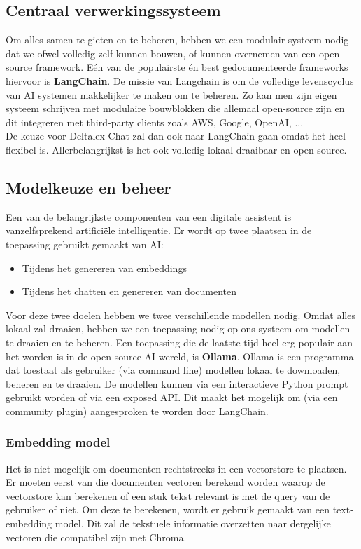\subsection{Centraal verwerkingssysteem}
Om alles samen te gieten en te beheren, hebben we een modulair systeem nodig dat we ofwel volledig zelf kunnen bouwen, of kunnen overnemen van een open-source framework. 
Eén van de populairste én best gedocumenteerde frameworks hiervoor is \textbf{LangChain}. 
De missie van Langchain is om de volledige levenscyclus van AI systemen makkelijker te maken om te beheren. 
Zo kan men zijn eigen systeem schrijven met modulaire bouwblokken die allemaal open-source zijn en dit integreren met third-party clients zoals AWS, Google, OpenAI, ... \\ 

De keuze voor Deltalex Chat zal dan ook naar LangChain gaan omdat het heel flexibel is. 
Allerbelangrijkst is het ook volledig lokaal draaibaar en open-source. 

\newpage
\subsection{Modelkeuze en beheer}
Een van de belangrijkste componenten van een digitale assistent is vanzelfsprekend artificiële intelligentie. 
Er wordt op twee plaatsen in de toepassing gebruikt gemaakt van AI: 

\begin{itemize}
	\item Tijdens het genereren van embeddings
	\item Tijdens het chatten en genereren van documenten
\end{itemize}

Voor deze twee doelen hebben we twee verschillende modellen nodig. 
Omdat alles lokaal zal draaien, hebben we een toepassing nodig op ons systeem om modellen te draaien en te beheren. 
Een toepassing die de laatste tijd heel erg populair aan het worden is in de open-source AI wereld, is \textbf{Ollama}. 
Ollama is een programma dat toestaat als gebruiker (via command line) modellen lokaal te downloaden, beheren en te draaien. 
De modellen kunnen via een interactieve Python prompt gebruikt worden of via een exposed API. 
Dit maakt het mogelijk om (via een community plugin) aangesproken te worden door LangChain. 

\subsubsection{Embedding model}
Het is niet mogelijk om documenten rechtstreeks in een vectorstore te plaatsen. 
Er moeten eerst van die documenten vectoren berekend worden waarop de vectorstore kan berekenen of een stuk tekst relevant is met de query van de gebruiker of niet. 
Om deze te berekenen, wordt er gebruik gemaakt van een text-embedding model. Dit zal de tekstuele informatie overzetten naar dergelijke vectoren die compatibel zijn met Chroma. 

